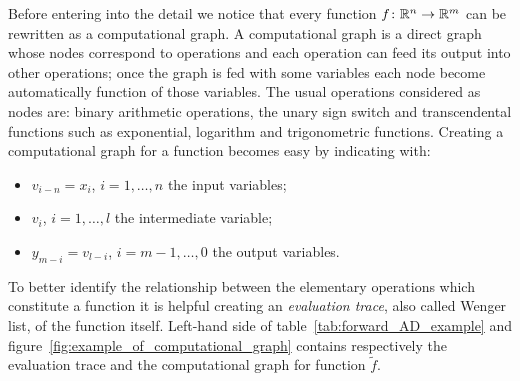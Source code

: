 Before entering into the detail we notice that every function $f \colon \mathbb{R}^n \to \mathbb{R}^m$ can be rewritten as a computational graph. A computational graph is a direct graph whose nodes correspond to operations and each operation can feed its output into other operations; once the graph is fed with some variables each node become automatically function of those variables. The usual operations considered as nodes are: binary arithmetic operations, the unary sign switch and transcendental functions such as exponential, logarithm and trigonometric functions.
Creating a computational graph for a function becomes easy by indicating with:
\begin{itemize}
	\item $v_{i-n}=x_i$, $i=1, \dots, n$ the input variables;
	\item $v_i$, $i=1, \dots, l$ the intermediate variable;
	\item $y_{m-i}=v_{l-i}$, $i=m-1, \dots, 0$ the output variables.
\end{itemize}
To better identify the relationship between the elementary operations which constitute a function it is helpful creating an \emph{evaluation trace}, also called Wenger list, of the function itself.
Left-hand side of table~\ref{tab:forward_AD_example} and figure~\ref{fig:example_of_computational_graph} contains respectively the evaluation trace and the computational graph for function $\tilde{f}$.


